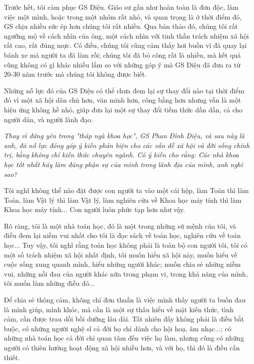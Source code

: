 Trước hết, tôi cảm phục GS Diệu. Giáo sư gần như hoàn toàn là đơn độc, làm việc một mình, hoặc trong một nhóm rất nhỏ, và quan trọng là ở thời điểm đó, GS chịu nhiều sức ép hơn chúng tôi rất nhiều. Qua bản thảo đó, chúng tôi rất ngưỡng mộ về cách nhìn của ông, một cách nhìn với tinh thần trách nhiệm xã hội rất cao, rất đúng mực. Có điều, chúng tôi cũng cảm thấy hơi buồn vì đã quay lại bánh xe mà người ta đã làm rồi; chúng tôi đã bỏ công rất là nhiều, mà kết quả cũng không có gì khác nhiều lắm so với những góp ý mà GS Diệu đã đưa ra từ 20-30 năm trước mà chúng tôi không được biết.

Những nỗ lực đó của GS Diệu có thể chưa đem lại sự thay đổi nào tại thời điểm đó vì một xã hội dân chủ hơn, văn minh hơn, công bằng hơn nhưng vẫn là một hiệu ứng không hề nhỏ, giúp đưa lại một sự thay đổi tiềm thức dần dần, cả cho người dân, và người lãnh đạo.

\emph{
Thay vì đứng yên trong "tháp ngà khoa học", GS Phan Đình Diệu, và sau này là anh, đã nỗ lực đóng góp ý kiến phản biện cho các vấn đề xã hội và đời sống chính trị, bằng không chỉ kiến thức chuyên ngành. Có ý kiến cho rằng: Các nhà khoa học tốt nhất hãy làm đúng phận sự của mình trong lãnh địa của mình, anh nghĩ sao?}

Tôi nghĩ không thể nào đặt được con người ta vào một cái hộp, làm Toán thì làm Toán, làm Vật lý thì làm Vật lý, làm nghiên cứu về Khoa học máy tính thì làm Khoa học máy tính... Con người luôn phức tạp hơn như vậy. 

Rõ ràng, tôi là một nhà toán học, đó là một trong những sứ mệnh của tôi, và điều đem lại niềm vui nhất cho tôi là đọc sách về toán học, nghiên cứu về toán học... Tuy vậy, tôi nghĩ rằng toán học không phải là toàn bộ con người  tôi, tôi có một số trách nhiệm xã hội nhất định, tôi muốn hiểu xã hội này, muốn hiểu về cuộc sống xung quanh mình, hiểu những người khác; muốn chia sẻ những niềm vui, những nỗi đau của người khác nữa trong phạm vi, trong khả năng của mình, tôi muốn làm những điều đó... 

Để chia sẻ thông cảm, không chỉ đơn thuần là việc mình thấy người ta buồn đau là mình giúp, mình khóc, mà cần là một sự thấu hiểu về mặt kiến thức, tình cảm, cần được trau dồi bồi dưỡng lâu dài. Tất nhiên đấy không phải là điều bắt buộc, có những người nghệ sĩ cả đời họ chỉ dành cho hội hoạ, âm nhạc...; có những nhà toán học cả đời chỉ quan tâm đến việc họ làm, nhưng cũng có những người có thiên hướng hoạt động xã hội nhiều hơn, và với họ, thì đó là điều cần thiết. 

